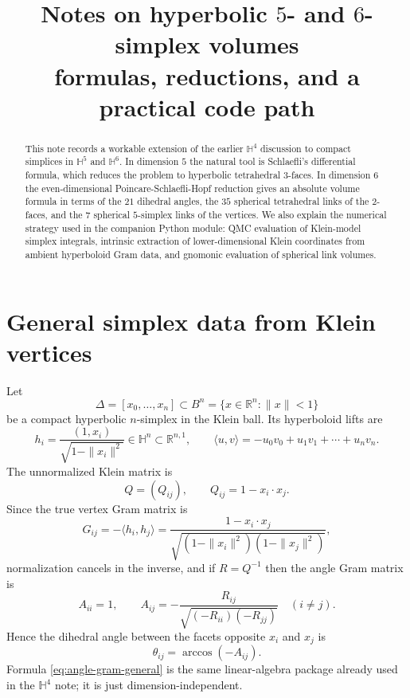 \documentclass[11pt]{article}
\title{Notes on hyperbolic $5$- and $6$-simplex volumes\\
formulas, reductions, and a practical code path}
\author{}
\date{}
\newcommand{\Hh}{\mathbb{H}}
\newcommand{\Rr}{\mathbb{R}}
\begin{document}
\maketitle

\begin{abstract}
This note records a workable extension of the earlier $\Hh^4$ discussion to compact simplices
in $\Hh^5$ and $\Hh^6$.  In dimension $5$ the natural tool is Schlaefli's differential formula,
which reduces the problem to hyperbolic tetrahedral $3$-faces.  In dimension $6$ the even-dimensional
Poincare-Schlaefli-Hopf reduction gives an absolute volume formula in terms of the $21$ dihedral
angles, the $35$ spherical tetrahedral links of the $2$-faces, and the $7$ spherical $5$-simplex
links of the vertices.  We also explain the numerical strategy used in the companion Python module:
QMC evaluation of Klein-model simplex integrals, intrinsic extraction of lower-dimensional Klein
coordinates from ambient hyperboloid Gram data, and gnomonic evaluation of spherical link volumes.
\end{abstract}

\section{General simplex data from Klein vertices}

Let
\[
\Delta=[x_0,\dots,x_n]\subset B^n=\{x\in \Rr^n:\|x\|<1\}
\]
be a compact hyperbolic $n$-simplex in the Klein ball.  Its hyperboloid lifts are
\[
 h_i=\frac{(1,x_i)}{\sqrt{1-\|x_i\|^2}}\in \Hh^n\subset \Rr^{n,1},
 \qquad
 \langle u,v\rangle=-u_0v_0+u_1v_1+\cdots+u_nv_n.
\]
The unnormalized Klein matrix is
\[
Q=(Q_{ij}),\qquad Q_{ij}=1-x_i\cdot x_j.
\]
Since the true vertex Gram matrix is
\[
G_{ij}=-\langle h_i,h_j\rangle=
\frac{1-x_i\cdot x_j}{\sqrt{(1-\|x_i\|^2)(1-\|x_j\|^2)}},
\]
normalization cancels in the inverse, and if $R=Q^{-1}$ then the angle Gram matrix is
\begin{equation}
\label{eq:angle-gram-general}
A_{ii}=1,
\qquad
A_{ij}=-\frac{R_{ij}}{\sqrt{(-R_{ii})(-R_{jj})}}
\quad (i\neq j).
\end{equation}
Hence the dihedral angle between the facets opposite $x_i$ and $x_j$ is
\begin{equation}
\label{eq:dihedral-general}
\theta_{ij}=\arccos(-A_{ij}).
\end{equation}
Formula \eqref{eq:angle-gram-general} is the same linear-algebra package already used in the
$\Hh^4$ note; it is just dimension-independent.
\end{document}
